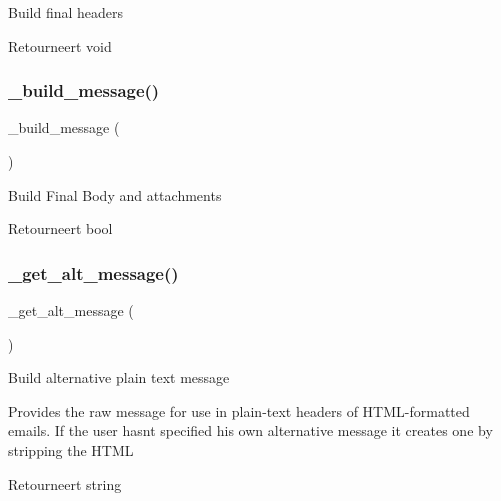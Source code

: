 Build final headers

\begin{DoxyReturn}{Retourneert}
void 
\end{DoxyReturn}
\mbox{\label{class_c_i___email_a9ddc60e529eb909ff0879781a6f296ff}} 
\subsubsection{\texorpdfstring{\_build\_message()}{\_build\_message()}}
{\footnotesize\ttfamily \+\_\+build\+\_\+message (\begin{DoxyParamCaption}{ }\end{DoxyParamCaption})\hspace{0.3cm}{\ttfamily [protected]}}

Build Final Body and attachments

\begin{DoxyReturn}{Retourneert}
bool 
\end{DoxyReturn}
\mbox{\label{class_c_i___email_a1a87461e94ab7466b7b6f22682c4a055}} 
\subsubsection{\texorpdfstring{\_get\_alt\_message()}{\_get\_alt\_message()}}
{\footnotesize\ttfamily \+\_\+get\+\_\+alt\+\_\+message (\begin{DoxyParamCaption}{ }\end{DoxyParamCaption})\hspace{0.3cm}{\ttfamily [protected]}}

Build alternative plain text message

Provides the raw message for use in plain-\/text headers of H\+T\+M\+L-\/formatted emails. If the user hasn\textquotesingle{}t specified his own alternative message it creates one by stripping the H\+T\+ML

\begin{DoxyReturn}{Retourneert}
string 
\end{DoxyReturn}
\mbox{\label{class_c_i___email_a0df0801e489187b9f8108ec776f98f2e}} 
